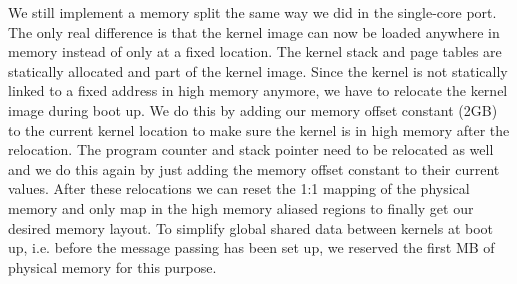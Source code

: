 \documentclass[a4paper,twoside]{report} %
\begin{document}
We still implement a memory split the same way we did in the
single-core port. The only real difference is that the kernel image
can now be loaded anywhere in memory instead of only at a fixed
location. The kernel stack and page tables are statically allocated
and part of the kernel image. Since the kernel is not statically
linked to a fixed address in high memory anymore, we have to relocate
the kernel image during boot up. We do this by adding our memory
offset constant (2GB) to the current kernel location to make sure the
kernel is in high memory after the relocation. The program counter and
stack pointer need to be relocated as well and we do this again by
just adding the memory offset constant to their current values. After
these relocations we can reset the 1:1 mapping of the physical memory
and only map in the high memory aliased regions to finally get our
desired memory layout. To simplify global shared data between kernels
at boot up, i.e. before the message passing has been set up, we
reserved the first MB of physical memory for this purpose.




\end{document}
